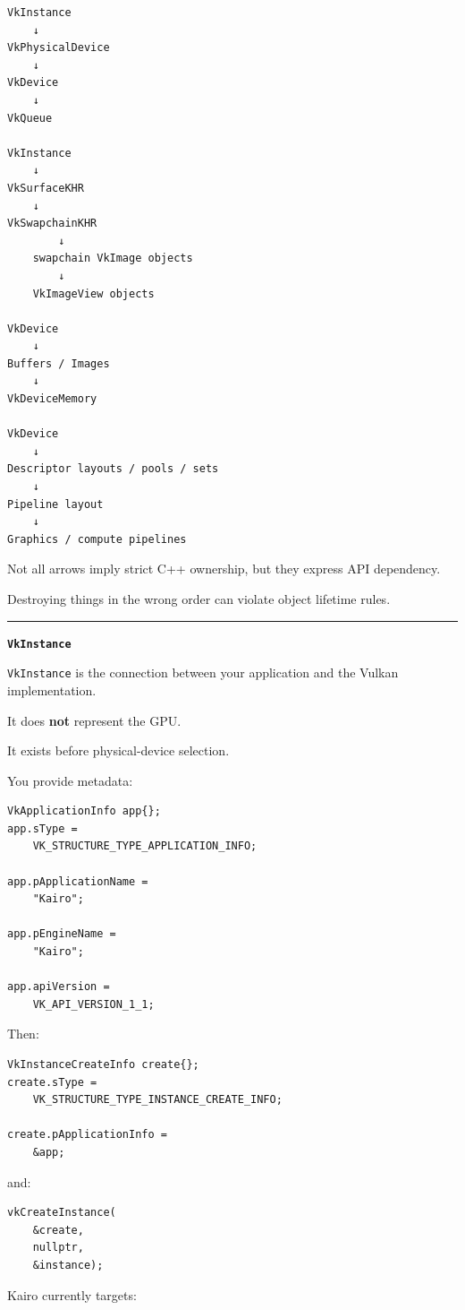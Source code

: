 \begin{verbatim}
VkInstance
    ↓
VkPhysicalDevice
    ↓
VkDevice
    ↓
VkQueue

VkInstance
    ↓
VkSurfaceKHR
    ↓
VkSwapchainKHR
        ↓
    swapchain VkImage objects
        ↓
    VkImageView objects

VkDevice
    ↓
Buffers / Images
    ↓
VkDeviceMemory

VkDevice
    ↓
Descriptor layouts / pools / sets
    ↓
Pipeline layout
    ↓
Graphics / compute pipelines
\end{verbatim}

Not all arrows imply strict C++ ownership, but they express API dependency.

Destroying things in the wrong order can violate object lifetime rules.

\begin{center}\rule{0.5\linewidth}{0.5pt}\end{center}

\textbf{\texttt{VkInstance}}

\texttt{VkInstance} is the connection between your application and the Vulkan implementation.

It does \textbf{not} represent the GPU.

It exists before physical-device selection.

You provide metadata:

\begin{verbatim}
VkApplicationInfo app{};
app.sType =
    VK_STRUCTURE_TYPE_APPLICATION_INFO;

app.pApplicationName =
    "Kairo";

app.pEngineName =
    "Kairo";

app.apiVersion =
    VK_API_VERSION_1_1;
\end{verbatim}

Then:

\begin{verbatim}
VkInstanceCreateInfo create{};
create.sType =
    VK_STRUCTURE_TYPE_INSTANCE_CREATE_INFO;

create.pApplicationInfo =
    &app;
\end{verbatim}

and:

\begin{verbatim}
vkCreateInstance(
    &create,
    nullptr,
    &instance);
\end{verbatim}

Kairo currently targets:

